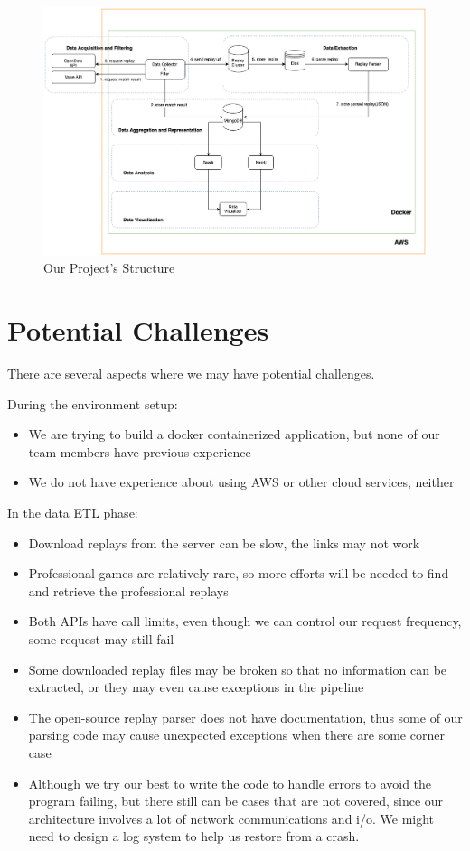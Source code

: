 \documentclass{article}
\begin{document}
\begin{figure}[H]
	\centering
	\includegraphics[width=\linewidth]{pic/arc.png}
	\caption{Our Project's Structure}
\end{figure}

\section{Potential Challenges}

There are several aspects where we may have potential challenges.

During the environment setup:

\begin{itemize}
	\item We are trying to build a docker containerized application, but none of our team members have previous experience
	\item We do not have experience about using AWS or other cloud services, neither
\end{itemize}

In the data ETL phase:

\begin{itemize}
	\item Download replays from the server can be slow, the links may not work
	\item Professional games are relatively rare, so more efforts will be needed to find and retrieve the professional replays
	\item Both APIs have call limits, even though we can control our request frequency, some request may still fail
	\item Some downloaded replay files may be broken so that no information can be extracted, or they may even cause exceptions in the pipeline
	\item The open-source replay parser does not have documentation, thus some of our parsing code may cause unexpected exceptions when there are some corner case
	\item Although we try our best to write the code to handle errors to avoid the program failing, but there still can be cases that are not covered, since our architecture involves a lot of network communications and i/o. We might need to design a log system to help us restore from a crash.
\end{itemize}
\end{document}
